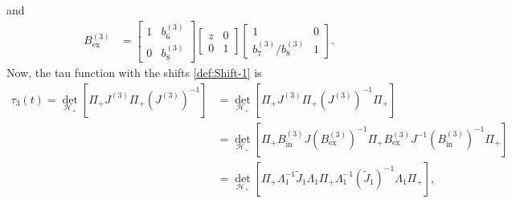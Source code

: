 \documentclass[a4paper,reqno,11pt]{amsart}
\numberwithin{equation}{section}
\numberwithin{figure}{section}
\theoremstyle{plain}
\theoremstyle{remark}
\numberwithin{rhp}{section}
\begin{document}
and
\begin{align}
      B^{(3)}_{\text{ex}} 
    &=\begin{bmatrix}
       1  & b_6^{(3)} \\
        0 & b_8^{(3)}
    \end{bmatrix} \begin{bmatrix}
       z  & 0 \\
        0 & 1
    \end{bmatrix} \begin{bmatrix}
       1  & 0 \\
        b_7^{(3)}/b_8^{(3)} & 1
    \end{bmatrix}.\label{B1out-fac}
\end{align}
Now, the tau function with the shifts \eqref{def:Shift-1} is 
\begin{align}
    \tau_3(t) =\det_{\mathcal{H}_{+}} \left[\Pi_{+} J^{(3)} \Pi_{+} (J^{(3)})^{-1} \right] &= \det_{\mathcal{H}_{+}} \left[\Pi_{+} J^{(3)} \Pi_{+} (J^{(3)})^{-1} \Pi_{+} \right]\\
    &= \det_{\mathcal{H}_{+}} \left[\Pi_{+} B^{(3)}_{\text{in}} J (B^{(3)}_{\text{ex}})^{-1}\Pi_{+} B^{(3)}_{\text{ex}} J^{-1} (B^{(3)}_{\text{in}})^{-1} \Pi_{+}\right]\\
       &= \det_{\mathcal{H}_{+}} \left[\Pi_{+} \Lambda_1^{-1} \widetilde{J}_1 \Lambda_1\Pi_{+} \Lambda_1^{-1} (\widetilde{J}_1)^{-1} \Lambda_1 \Pi_{+}\right], \label{tau1simpl:Step1}
\end{align}
\end{document}
